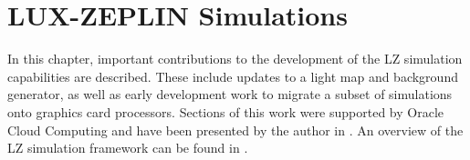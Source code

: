 \chapter{LUX-ZEPLIN Simulations}
\par
In this chapter, important contributions to the development of the LZ simulation capabilities are described.
These include updates to a light map and background generator, as well as early development work to migrate a subset of simulations onto graphics card processors.
Sections of this work were supported by Oracle Cloud Computing and have been presented by the author in \cite{se_poster_2018,se_poster_2019_summerschool,se_poster_2019_bristol,SEriksen_IoP_2021_talk_ref}.
An overview of the LZ simulation framework can be found in \cite{lz_simulations_ref}.






